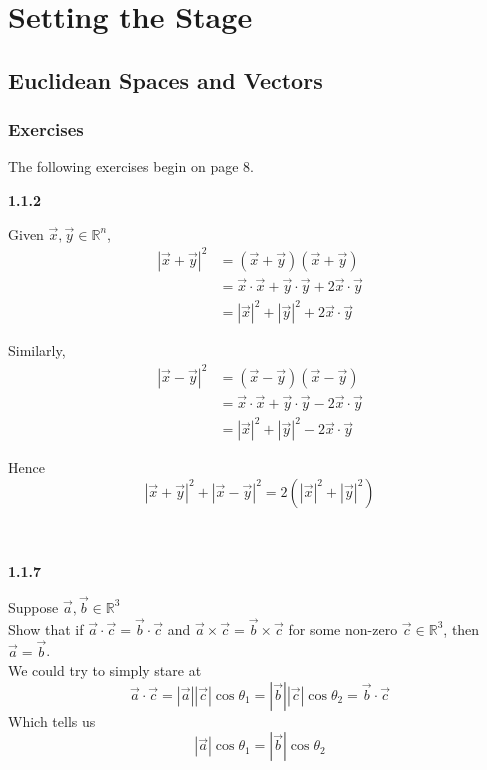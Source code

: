 \section{Setting the Stage}

\subsection{Euclidean Spaces and Vectors}

\subsubsection{Exercises}

The following exercises begin on page 8.

\textbf{1.1.2}

Given $\vec{x}, \vec{y} \in \mathbb{R}^n$,
\begin{align*}
|\vec{x} + \vec{y} |^2 &= (\vec{x} +\vec{y}) (\vec{x} +\vec{y}) \\
&= \vec{x}\cdot\vec{x} + \vec{y}\cdot\vec{y} + 2\vec{x}\cdot\vec{y} \\
&= |\vec{x}|^2 + |\vec{y}|^2 + 2\vec{x}\cdot\vec{y}
\end{align*}

Similarly,
\begin{align*}
|\vec{x} - \vec{y} |^2 &= (\vec{x} - \vec{y}) (\vec{x} - \vec{y}) \\
    &= \vec{x}\cdot\vec{x} + \vec{y}\cdot\vec{y} - 2\vec{x}\cdot\vec{y} \\
    &= |\vec{x}|^2 + |\vec{y}|^2 - 2\vec{x}\cdot\vec{y}
\end{align*}

Hence
$$
|\vec{x} + \vec{y} |^2 + |\vec{x} - \vec{y} |^2 = 2\left( |\vec{x}|^2 + |\vec{y}|^2 \right)
$$
\\~\\


\label{folland:1.1.7}

\textbf{1.1.7}

Suppose $\vec{a}, \vec{b} \in \mathbb{R}^3$
\\

Show that if $\vec{a}\cdot\vec{c} = \vec{b}\cdot\vec{c}$ and
$\vec{a}\times\vec{c} = \vec{b}\times\vec{c}$ for some non-zero $\vec{c} \in\mathbb{R}^3$,
then $\vec{a} = \vec{b}$.
\\

We could try to simply stare at
$$
\vec{a}\cdot\vec{c} = |\vec{a}| |\vec{c}| \cos{\theta_1} 
= |\vec{b}| |\vec{c}| \cos{\theta_2} = \vec{b}\cdot\vec{c}
$$
Which tells us
$$
|\vec{a}| \cos{\theta_1} = |\vec{b}| \cos{\theta_2}
$$


